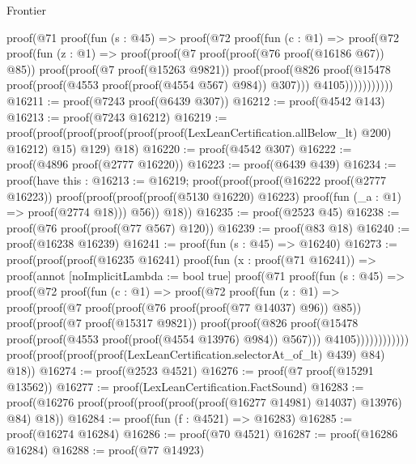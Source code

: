\begin{lexlean}{Frontier}
\begin{coremodule}
      proof(@71
          proof(fun (s : @45) =>
            proof(@72
                proof(fun (c : @1) =>
                  proof(@72
                      proof(fun (z : @1) =>
                        proof(proof(@7 proof(proof(@76 proof(@16186 @67)) @85))
                            proof(proof(@7 proof(@15263 @9821))
                                proof(proof(@826
                                      proof(@15478
                                          proof(proof(@4553 proof(proof(@4554 @567) @984)) @307)))
                                    @4105)))))))))))
@16211 := proof(@7243 proof(@6439 @307))
@16212 := proof(@4542 @143)
@16213 := proof(@7243 @16212)
@16219 := proof(proof(proof(proof(proof(proof(LexLeanCertification.allBelow_lt) @200) @16212) @15)
        @129)
      @18)
@16220 := proof(@4542 @307)
@16222 := proof(@4896 proof(@2777 @16220))
@16223 := proof(@6439 @439)
@16234 := proof(have this : @16213 := @16219;
    proof(proof(proof(@16222 proof(@2777 @16223))
          proof(proof(proof(proof(@5130 @16220) @16223) proof(fun (_a : @1) => proof(@2774 @18)))
              @56))
        @18))
@16235 := proof(@2523 @45)
@16238 := proof(@76 proof(proof(@77 @567) @120))
@16239 := proof(@83 @18)
@16240 := proof(@16238 @16239)
@16241 := proof(fun (s : @45) => @16240)
@16273 := proof(proof(proof(@16235 @16241)
        proof(fun (x : proof(@71 @16241)) =>
          proof(annot [noImplicitLambda := bool true]
            proof(@71
                proof(fun (s : @45) =>
                  proof(@72
                      proof(fun (c : @1) =>
                        proof(@72
                            proof(fun (z : @1) =>
                              proof(proof(@7 proof(proof(@76 proof(proof(@77 @14037) @96)) @85))
                                  proof(proof(@7 proof(@15317 @9821))
                                      proof(proof(@826
                                            proof(@15478
                                                proof(proof(@4553 proof(proof(@4554 @13976) @984))
                                                    @567)))
                                          @4105))))))))))))
      proof(proof(proof(proof(LexLeanCertification.selectorAt_of_lt) @439) @84) @18))
@16274 := proof(@2523 @4521)
@16276 := proof(@7 proof(@15291 @13562))
@16277 := proof(LexLeanCertification.FactSound)
@16283 := proof(@16276 proof(proof(proof(proof(proof(@16277 @14981) @14037) @13976) @84) @18))
@16284 := proof(fun (f : @4521) => @16283)
@16285 := proof(@16274 @16284)
@16286 := proof(@70 @4521)
@16287 := proof(@16286 @16284)
@16288 := proof(@77 @14923)

\end{coremodule}
\end{lexlean}
